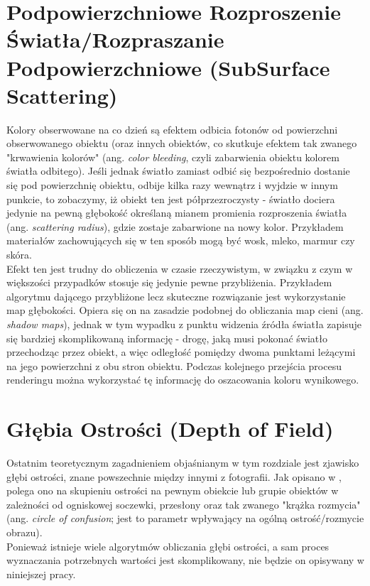\section{Podpowierzchniowe Rozproszenie Światła/Rozpraszanie Podpowierzchniowe (SubSurface Scattering)}

Kolory obserwowane na co dzień są efektem odbicia fotonów od powierzchni obserwowanego obiektu (oraz innych obiektów, co skutkuje efektem tak zwanego "krwawienia kolorów" (ang. \emph{color bleeding}, czyli zabarwienia obiektu kolorem światła odbitego). Jeśli jednak światło zamiast odbić się bezpośrednio dostanie się pod powierzchnię obiektu, odbije kilka razy wewnątrz i wyjdzie w innym punkcie, to zobaczymy, iż obiekt ten jest półprzezroczysty - światło dociera jedynie na pewną głębokość określaną mianem promienia rozproszenia światła (ang. \emph{scattering radius}), gdzie zostaje zabarwione na nowy kolor. Przykładem materiałów zachowujących się w ten sposób mogą być wosk, mleko, marmur czy skóra.\\
Efekt ten jest trudny do obliczenia w czasie rzeczywistym, w związku z czym w większości przypadków stosuje się jedynie pewne przybliżenia. Przykładem algorytmu dającego przybliżone lecz skuteczne rozwiązanie jest wykorzystanie map głębokości. Opiera się on na zasadzie podobnej do obliczania map cieni (ang. \emph{shadow maps}), jednak w tym wypadku z punktu widzenia źródła światła zapisuje się bardziej skomplikowaną informację - drogę, jaką musi pokonać światło przechodząc przez obiekt, a więc odległość pomiędzy dwoma punktami leżącymi na jego powierzchni z obu stron obiektu. Podczas kolejnego przejścia procesu renderingu można wykorzystać tę informację do oszacowania koloru wynikowego.

\section{Głębia Ostrości (Depth of Field)}

Ostatnim teoretycznym zagadnieniem objaśnianym w tym rozdziale jest zjawisko głębi ostrości, znane powszechnie między innymi z fotografii. Jak opisano w \cite{gpugems_23}, polega ono na skupieniu ostrości na pewnym obiekcie lub grupie obiektów w zależności od ogniskowej soczewki, przesłony oraz tak zwanego "krążka rozmycia" (ang. \emph{circle of confusion}; jest to parametr wpływający na ogólną ostrość/rozmycie obrazu).\\
Ponieważ istnieje wiele algorytmów obliczania głębi ostrości, a sam proces wyznaczania potrzebnych wartości jest skomplikowany, nie będzie on opisywany w niniejszej pracy.
